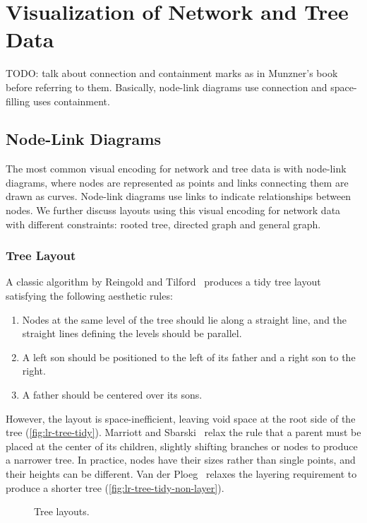 \section{Visualization of Network and Tree Data}

TODO: talk about connection and containment marks as in Munzner's book before referring to them. Basically, node-link diagrams use connection and space-filling uses containment.

\subsection{Node-Link Diagrams}
The most common visual encoding for network and tree data is with node-link diagrams, where nodes are represented as points and links connecting them are drawn as curves. Node-link diagrams use links to indicate relationships between nodes. We further discuss layouts using this visual encoding for network data with different constraints: rooted tree, directed graph and general graph.

\subsubsection{Tree Layout}
A classic algorithm by Reingold and Tilford~\cite{Reingold1981} produces a tidy tree layout satisfying the following aesthetic rules:
\begin{enumerate}
	\item Nodes at the same level of the tree should lie along a straight line, and the straight lines defining the levels should be parallel.
	\item A left son should be positioned to the left of its father and a right son to the right.
	\item A father should be centered over its sons.
\end{enumerate} 

However, the layout is space-inefficient, leaving void space at the root side of the tree (\autoref{fig:lr-tree-tidy}). Marriott and Sbarski~\cite{Marriott2007} relax the rule that a parent must be placed at the center of its children, slightly shifting branches or nodes to produce a narrower tree. In practice, nodes have their sizes rather than single points, and their heights can be different. Van der Ploeg~\cite{VanderPloeg2014} relaxes the layering requirement to produce a shorter tree (\autoref{fig:lr-tree-tidy-non-layer}).

\begin{figure}[!htb]
\centering
{}
\hfill
{}
\caption{Tree layouts.}
\end{figure}

